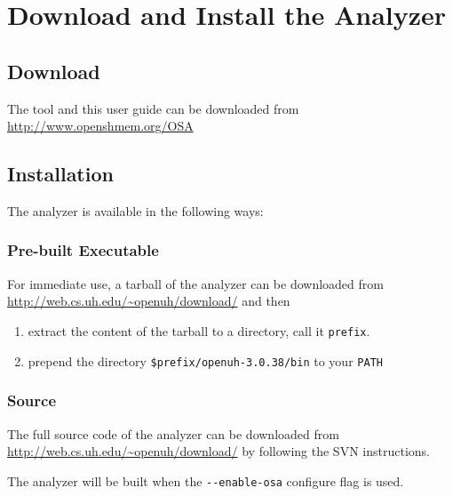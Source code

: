 \section{Download and Install the \openshmem Analyzer}

\subsection{Download}

The tool and this user guide can be downloaded from
\url{http://www.openshmem.org/OSA}

\subsection{Installation}


The \openshmem analyzer is available in the following ways:

\subsubsection{Pre-built Executable}

For immediate use, a tarball of the \openshmem analyzer can be
downloaded from \\
\mbox{\url{http://web.cs.uh.edu/~openuh/download/}}
and then

\begin{enumerate}
\item extract the content of the tarball to a directory, call it
  \texttt{prefix}.
\item prepend the directory \texttt{\$prefix/openuh-3.0.38/bin} to
  your \texttt{PATH}
\end{enumerate}

\subsubsection{Source}

The full source code of the \openshmem analyzer can be downloaded from \\
\mbox{\url{http://web.cs.uh.edu/~openuh/download/}} by following
the SVN instructions.

The \openshmem analyzer will be built when the \texttt{-{}-{}enable-osa}
configure flag is used.
